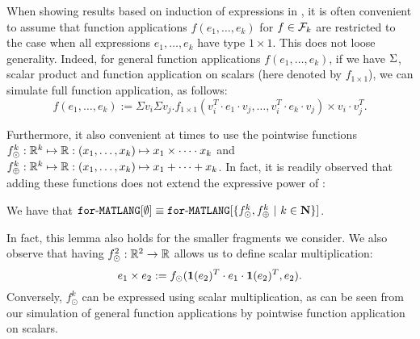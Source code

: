When showing results based on induction of expressions in \langfor, it is often convenient to assume that function applications $f(e_1,\ldots,e_k)$ for $f\in\mathcal{F}_k$ are restricted to
the case when all expressions $e_1,\ldots,e_k$ have type $1\times 1$. This does not loose generality. Indeed,
for general function applications $f(e_1,\ldots,e_k)$, if we have $\Sigma$, scalar product and function application on scalars (here denoted by $f_{1\times 1}$), we can simulate full function application, as follows:
 $$
f(e_1,\ldots, e_k) :=\Sigma v_i \Sigma v_j. f_{1\times 1}(v_i^T\cdot e_1\cdot v_j, \ldots ,v_i^T\cdot e_k\cdot v_j) \times v_i\cdot v_j^T.
$$

Furthermore, it also convenient at times to use the pointwise functions
$f_\odot^k:\mathbb{R}^k\mapsto \mathbb{R}:(x_1,\ldots,x_k)\mapsto x_1\times\cdots \cdot x_k$ and 
$f_\oplus^k:\mathbb{R}^k\mapsto \mathbb{R}:(x_1,\ldots,x_k)\mapsto x_1+\cdots + x_k$. In fact, it is readily observed that adding these functions does not extend the expressive power of \langfor:
\begin{lemma}
\label{lm-prod-sum}
We have that $\texttt{for}\text{-}\texttt{MATLANG}[\emptyset] \equiv \texttt{for}\text{-}\texttt{MATLANG}[\{f_\odot^k,f_\oplus^k \ | \ k\in \mathbf{N}\}]$.
\end{lemma}
In fact, this lemma also holds for the smaller fragments we consider.
%
We also observe that having $f_\odot^2:\mathbb{R}^2\to\mathbb{R}$ allows us to define scalar multiplication:
$$
e_1\times e_2 :=f_{\odot}(\mathbf{1}(e_2)^T\cdot e_1 \cdot \mathbf{1}(e_2)^T, e_2).
$$
Conversely, $f_\odot^k$ can be expressed using scalar multiplication, as can be seen from our simulation of general function applications by pointwise function application on scalars.
%
%
%
%
